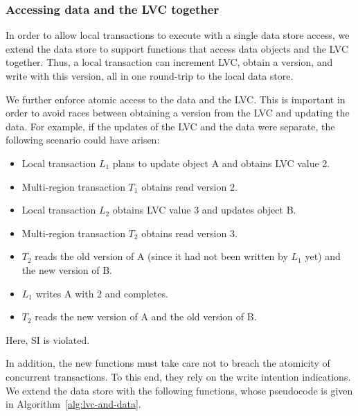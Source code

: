 \subsubsection{Accessing data and the LVC together} \label{ssec:lvc-access}

In order to allow local transactions to execute with a single data store access,
we extend the data store to support functions that access data objects and the
LVC together. Thus, a local transaction can increment LVC, obtain a version, and
write with this version, all in one round-trip to the local data store.

We further enforce atomic access to the data and the LVC. This is important in
order to avoid races between obtaining a version from the LVC and updating the
data. For example, if the updates of the LVC and the data were separate, the
following scenario could have arisen:
\begin{itemize}
  \item Local transaction $L_1$ plans to update object A and obtains LVC value 2.
  \item Multi-region transaction $T_1$ obtains read version 2.
  \item Local transaction $L_2$ obtains LVC value 3 and updates object B.
  \item Multi-region transaction $T_2$ obtains read version 3.
  \item $T_2$ reads the old version of A (since it had not been written by $L_1$ yet)
  and the new version of  B.
  \item $L_1$ writes A with 2 and completes.
  \item $T_2$ reads the new version of A and the old version of  B.
\end{itemize}
Here, SI is violated.

In addition, the new functions must take care not to breach the  atomicity of
concurrent transactions. To this end, they rely on the write intention indications.
We extend the data store with the following functions, whose 
pseudocode is given in Algorithm~\ref{alg:lvc-and-data}. 

